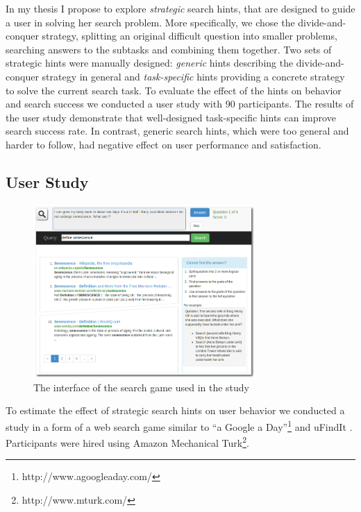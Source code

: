 In my thesis I propose to explore {\em strategic} search hints, that are designed to guide a user in solving her search problem.
More specifically, we chose the divide-and-conquer strategy, \ie splitting an original difficult question into smaller problems, searching answers to the subtasks and combining them together.
Two sets of strategic hints were manually designed: {\em generic} hints describing the divide-and-conquer strategy in general and {\em task-specific} hints providing a concrete strategy to solve the current search task.
To evaluate the effect of the hints on behavior and search success we conducted a user study with 90 participants.
The results of the user study demonstrate that well-designed task-specific hints can improve search success rate.
In contrast, generic search hints, which were too general and harder to follow, had negative effect on user performance and satisfaction.

\subsection{User Study}

\begin{figure}
\centering
\includegraphics[width=0.75\textwidth]{img/ufindit}
\caption{The interface of the search game used in the study}
\label{figure:ufindit}
\end{figure}

To estimate the effect of strategic search hints on user behavior we conducted a study in a form of a web search game similar to ``a Google a Day''\footnote{http://www.agoogleaday.com/} and uFindIt \cite{Ageev:2011:FYG:2009916.2009965}. Participants were hired using Amazon Mechanical Turk\footnote{http://www.mturk.com/}. 

